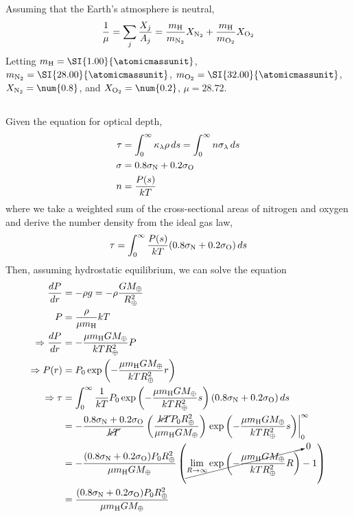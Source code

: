 \documentclass{article}
\begin{document}
Assuming that the Earth's atmosphere is neutral,
\begin{equation}
    \frac{1}{\mu} = \sum_j \frac{X_j}{A_j} = \frac{m_{\ce{H}}}{m_{\ce{N2}}} X_{\ce{N2}} + \frac{m_{\ce{H}}}{m_{\ce{O2}}} X_{\ce{O2}}
\end{equation}
Letting \(m_{\ce{H}} = \SI{1.00}{\atomicmassunit}\), \(m_{\ce{N2}} = \SI{28.00}{\atomicmassunit}\), \(m_{\ce{O2}} = \SI{32.00}{\atomicmassunit}\), \(X_{\ce{N2}} = \num{0.8}\), and \(X_{\ce{O2}} = \num{0.2}\), \(\mu = \num{28.72}\).

\subsection{}

Given the equation for optical depth,
\begin{align}
    \tau &= \int_0^\infty \kappa_\lambda \rho \, ds = \int_0^\infty n \sigma_\lambda \, ds \\
    \sigma &= 0.8 \sigma_{\ce{N}} + 0.2 \sigma_{\ce{O}} \\
    n &= \frac{P(s)}{kT}
\end{align}
where we take a weighted sum of the cross-sectional areas of nitrogen and oxygen and derive the number density from the ideal gas law,
\begin{equation}
    \tau = \int_0^\infty \frac{P(s)}{kT} (0.8 \sigma_{\ce{N}} + 0.2 \sigma_{\ce{O}}) \, ds
\end{equation}
Then, assuming hydrostatic equilibrium, we can solve the equation
\begin{align}
    \frac{d P}{d r} &= -\rho g  = -\rho \frac{G M_\oplus}{R_\oplus^2} \\
    P &= \frac{\rho}{\mu m_{\ce{H}}} kT \\
    \Rightarrow \frac{d P}{d r} &= -\frac{\mu m_{\ce{H}} G M_\oplus}{kT R_\oplus^2} P \\
    \Rightarrow P(r) &= P_0 \exp\left(-\frac{\mu m_{\ce{H}} G M_\oplus}{kT R_\oplus^2} r\right) \\
    \Rightarrow \tau &= \int_0^\infty \frac{1}{kT} P_0 \exp\left(-\frac{\mu m_{\ce{H}} G M_\oplus}{kT R_\oplus^2} s\right) (0.8 \sigma_{\ce{N}} + 0.2 \sigma_{\ce{O}}) \, ds \\
    &= -\frac{0.8\sigma_{\ce{N}} + 0.2\sigma_{\ce{O}}}{\cancel{kT}} \left(\frac{\cancel{kT} P_0 R_\oplus^2}{\mu m_{\ce{H}} G M_\oplus}\right) \left.\exp\left(-\frac{\mu m_{\ce{H}} G M_\oplus}{kT R_\oplus^2} s\right) \right|_0^\infty \\
    &= -\frac{(0.8\sigma_{\ce{N}} + 0.2\sigma_{\ce{O}}) P_0 R_\oplus^2}{\mu m_{\ce{H}} G M_\oplus} \left(\cancelto{0}{\lim_{R \to \infty} \exp\left(-\frac{\mu m_{\ce{H}} G M_\oplus}{kT R_\oplus^2} R\right)} - 1\right) \\
    &= \frac{(0.8\sigma_{\ce{N}} + 0.2\sigma_{\ce{O}}) P_0 R_\oplus^2}{\mu m_{\ce{H}} G M_\oplus}
\end{align}
\end{document}
